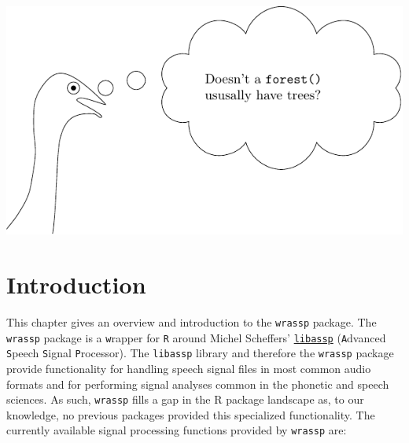 \documentclass[]{book}
\theoremstyle{definition}
\theoremstyle{definition}
\theoremstyle{definition}
\theoremstyle{remark}
\begin{document}
\begin{center}\includegraphics[width=0.75\linewidth]{pics/EMU-webAppEmu_wrassp} \end{center}

\hypertarget{introduction}{%
\section{Introduction}\label{introduction}}

This chapter gives an overview and introduction to the \texttt{wrassp}
package. The \texttt{wrassp} package is a \texttt{w}rapper for
\texttt{R} around Michel Scheffers'
\href{http://libassp.sourceforge.net/}{\texttt{libassp}}
(\texttt{A}dvanced \texttt{S}peech \texttt{S}ignal \texttt{P}rocessor).
The \texttt{libassp} library and therefore the \texttt{wrassp} package
provide functionality for handling speech signal files in most common
audio formats and for performing signal analyses common in the phonetic
and speech sciences. As such, \texttt{wrassp} fills a gap in the R
package landscape as, to our knowledge, no previous packages provided
this specialized functionality. The currently available signal
processing functions provided by \texttt{wrassp} are:
\end{document}
